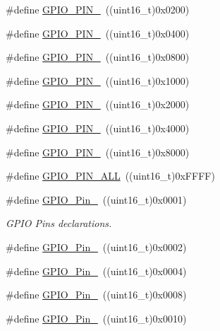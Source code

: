 \begin{DoxyCompactItemize}
\item 
\#define \hyperlink{group___t_m___g_p_i_o___macros_ga4c503cb4a0dc0d18261080051d9c2daf}{G\+P\+I\+O\+\_\+\+P\+I\+N\+\_}~((uint16\+\_\+t)0x0200)
\item 
\#define \hyperlink{group___t_m___g_p_i_o___macros_gac102c0123cb8bcadc5b590cd940b9e20}{G\+P\+I\+O\+\_\+\+P\+I\+N\+\_}~((uint16\+\_\+t)0x0400)
\item 
\#define \hyperlink{group___t_m___g_p_i_o___macros_ga79f6797ea82c1fb25cd6c0e14e44d312}{G\+P\+I\+O\+\_\+\+P\+I\+N\+\_}~((uint16\+\_\+t)0x0800)
\item 
\#define \hyperlink{group___t_m___g_p_i_o___macros_ga95f9ce5911fa8b209defb969db93ced3}{G\+P\+I\+O\+\_\+\+P\+I\+N\+\_}~((uint16\+\_\+t)0x1000)
\item 
\#define \hyperlink{group___t_m___g_p_i_o___macros_ga173023dced8f9692ade0f1176558ef70}{G\+P\+I\+O\+\_\+\+P\+I\+N\+\_}~((uint16\+\_\+t)0x2000)
\item 
\#define \hyperlink{group___t_m___g_p_i_o___macros_ga315b4dc1a0c1f9021b3d3a8fe9ccc0c3}{G\+P\+I\+O\+\_\+\+P\+I\+N\+\_}~((uint16\+\_\+t)0x4000)
\item 
\#define \hyperlink{group___t_m___g_p_i_o___macros_ga77be5756e80bcdf18e1aa39b35d1d640}{G\+P\+I\+O\+\_\+\+P\+I\+N\+\_}~((uint16\+\_\+t)0x8000)
\item 
\#define \hyperlink{group___t_m___g_p_i_o___macros_gada8dca690b8e25529328ecf92e8fd1a5}{G\+P\+I\+O\+\_\+\+P\+I\+N\+\_\+\+A\+LL}~((uint16\+\_\+t)0x\+F\+F\+F\+F)
\item 
\#define \hyperlink{group___t_m___g_p_i_o___macros_gab305b8d1be9f89bf2b4a05589b456049}{G\+P\+I\+O\+\_\+\+Pin\+\_}~((uint16\+\_\+t)0x0001)
\begin{DoxyCompactList}\small\item\em G\+P\+IO Pins declarations. \end{DoxyCompactList}\item 
\#define \hyperlink{group___t_m___g_p_i_o___macros_ga29db642c26f1fa0fffc3ecadcd30f82b}{G\+P\+I\+O\+\_\+\+Pin\+\_}~((uint16\+\_\+t)0x0002)
\item 
\#define \hyperlink{group___t_m___g_p_i_o___macros_gabdf6630324b2f99360537a310687187c}{G\+P\+I\+O\+\_\+\+Pin\+\_}~((uint16\+\_\+t)0x0004)
\item 
\#define \hyperlink{group___t_m___g_p_i_o___macros_ga763c6544859dbe28cd3f8ad820045556}{G\+P\+I\+O\+\_\+\+Pin\+\_}~((uint16\+\_\+t)0x0008)
\item 
\#define \hyperlink{group___t_m___g_p_i_o___macros_gacbf04d09b954606cdcc55eb2e81780e3}{G\+P\+I\+O\+\_\+\+Pin\+\_}~((uint16\+\_\+t)0x0010)

\end{DoxyCompactItemize}
